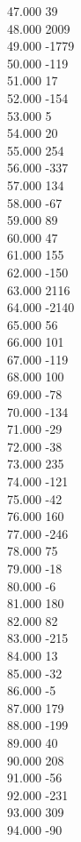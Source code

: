 { 47.000	39 \\
 48.000	2009 \\
 49.000	-1779 \\
 50.000	-119 \\
 51.000	17 \\
 52.000	-154 \\
 53.000	5 \\
 54.000	20 \\
 55.000	254 \\
 56.000	-337 \\
 57.000	134 \\
 58.000	-67 \\
 59.000	89 \\
 60.000	47 \\
 61.000	155 \\
 62.000	-150 \\
 63.000	2116 \\
 64.000	-2140 \\
 65.000	56 \\
 66.000	101 \\
 67.000	-119 \\
 68.000	100 \\
 69.000	-78 \\
 70.000	-134 \\
 71.000	-29 \\
 72.000	-38 \\
 73.000	235 \\
 74.000	-121 \\
 75.000	-42 \\
 76.000	160 \\
 77.000	-246 \\
 78.000	75 \\
 79.000	-18 \\
 80.000	-6 \\
 81.000	180 \\
 82.000	82 \\
 83.000	-215 \\
 84.000	13 \\
 85.000	-32 \\
 86.000	-5 \\
 87.000	179 \\
 88.000	-199 \\
 89.000	40 \\
 90.000	208 \\
 91.000	-56 \\
 92.000	-231 \\
 93.000	309 \\
 94.000	-90 \\
}
